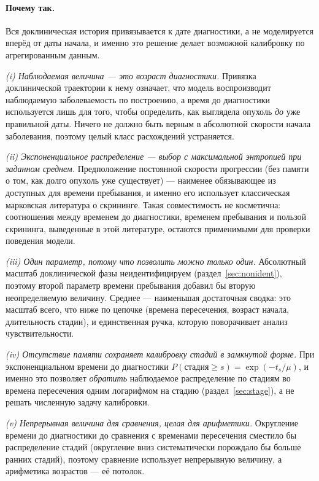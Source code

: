\documentclass[12pt,a4paper]{article}
\newcommand{\why}[1]{\paragraph{Почему так.} #1}
\begin{document}
\why{Вся доклиническая история привязывается к дате диагностики, а не моделируется вперёд от даты начала, и
именно это решение делает возможной калибровку по агрегированным данным.

\emph{(i) Наблюдаемая величина --- это возраст диагностики.} Привязка доклинической траектории к нему
означает, что модель воспроизводит наблюдаемую заболеваемость по построению, а время до диагностики
используется лишь для того, чтобы определить, как выглядела опухоль \emph{до} уже правильной даты. Ничего
не должно быть верным в абсолютной скорости начала заболевания, поэтому целый класс расхождений устраняется.

\emph{(ii) Экспоненциальное распределение --- выбор с максимальной энтропией при заданном среднем.}
Предположение постоянной скорости прогрессии (без памяти о том, как долго опухоль уже существует) ---
наименее обязывающее из доступных для времени пребывания, и именно его использует классическая марковская
литература о скрининге. Такая совместимость не косметична: соотношения между временем до диагностики,
временем пребывания и пользой скрининга, выведенные в этой литературе, остаются применимыми для проверки
поведения модели.

\emph{(iii) Один параметр, потому что позволить можно только один.} Абсолютный масштаб доклинической фазы
неидентифицируем (раздел~\ref{sec:nonident}), поэтому второй параметр времени пребывания добавил бы вторую
неопределяемую величину. Среднее --- наименьшая достаточная сводка: это масштаб всего, что ниже по цепочке
(времена пересечения, возраст начала, длительность стадии), и единственная ручка, которую поворачивает
анализ чувствительности.

\emph{(iv) Отсутствие памяти сохраняет калибровку стадий в замкнутой форме.} При экспоненциальном времени
до диагностики $P(\text{стадия} \ge s) = \exp(-t_s/\mu)$, и именно это позволяет \emph{обратить} наблюдаемое
распределение по стадиям во времена пересечения одним логарифмом на стадию (раздел~\ref{sec:stage}), а не
решать численную задачу калибровки.

\emph{(v) Непрерывная величина для сравнения, целая для арифметики.} Округление времени до диагностики до
сравнения с временами пересечения сместило бы распределение стадий (округление вниз систематически
порождало бы больше ранних стадий), поэтому сравнение использует непрерывную величину, а арифметика
возрастов --- её потолок.}
\end{document}
